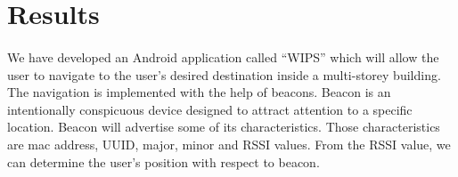 \documentclass[a4paper,12pt]{report}
\begin{document}
\section{Results}
\paragraph{} We have developed an Android application called ``WIPS'' which will allow the user to navigate to the user's desired destination inside a multi-storey building. The navigation is implemented with the help of beacons. Beacon is an intentionally conspicuous device designed to attract attention to a specific location. Beacon will advertise some of its characteristics. Those characteristics are mac address, UUID, major, minor and RSSI values. From the RSSI value, we can determine the user's position with respect to beacon.
\end{document}
